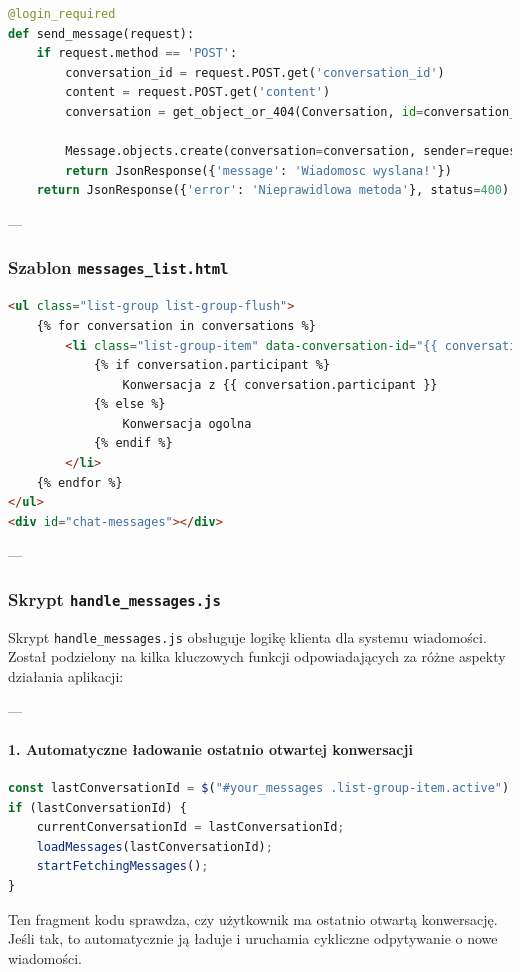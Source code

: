 \documentclass[12pt,a4paper,oneside]{article}
\theoremstyle{definition}
\numberwithin{equation}{section}
\begin{document}
\begin{lstlisting}[language=Python, caption=Funkcja \texttt{send\_message}]
@login_required
def send_message(request):
    if request.method == 'POST':
        conversation_id = request.POST.get('conversation_id')
        content = request.POST.get('content')
        conversation = get_object_or_404(Conversation, id=conversation_id, participants=request.user)

        Message.objects.create(conversation=conversation, sender=request.user, content=content.strip())
        return JsonResponse({'message': 'Wiadomosc wyslana!'})
    return JsonResponse({'error': 'Nieprawidlowa metoda'}, status=400)
\end{lstlisting}

---

\subsubsection{Szablon \texttt{messages\_list.html}}

\begin{lstlisting}[language=HTML, caption=Szablon \texttt{messages\_list.html}]
<ul class="list-group list-group-flush">
    {% for conversation in conversations %}
        <li class="list-group-item" data-conversation-id="{{ conversation.id }}">
            {% if conversation.participant %}
                Konwersacja z {{ conversation.participant }}
            {% else %}
                Konwersacja ogolna
            {% endif %}
        </li>
    {% endfor %}
</ul>
<div id="chat-messages"></div>
\end{lstlisting}

---
\subsubsection{Skrypt \texttt{handle\_messages.js}}
Skrypt \texttt{handle\_messages.js} obsługuje logikę klienta dla systemu wiadomości. Został podzielony na kilka kluczowych funkcji odpowiadających za różne aspekty działania aplikacji:

---

\paragraph{1. Automatyczne ładowanie ostatnio otwartej konwersacji}
\begin{lstlisting}[language=JavaScript, caption=Automatyczne ładowanie ostatnio otwartej konwersacji]
const lastConversationId = $("#your_messages .list-group-item.active").data("conversation-id");
if (lastConversationId) {
    currentConversationId = lastConversationId;
    loadMessages(lastConversationId);
    startFetchingMessages();
}
\end{lstlisting}
Ten fragment kodu sprawdza, czy użytkownik ma ostatnio otwartą konwersację. Jeśli tak, to automatycznie ją ładuje i uruchamia cykliczne odpytywanie o nowe wiadomości.
\end{document}
